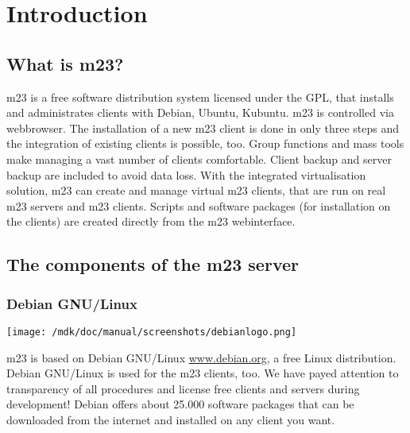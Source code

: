 \chapter{Introduction}
\section{What is m23?}
m23 is a free software distribution system licensed under the GPL, that installs and administrates clients with Debian, Ubuntu, Kubuntu. m23 is controlled via webbrowser. The installation of a new m23 client is done in only three steps and the integration of existing clients is possible, too. Group functions and mass tools make managing a vast number of clients comfortable. Client backup and server backup are included to avoid data loss. With the integrated virtualisation solution, m23 can create and manage virtual m23 clients, that are run on real m23 servers and m23 clients. Scripts and software packages (for installation on the clients) are created directly from the m23 webinterface. 

\section{The components of the m23 server}
\subsection{Debian GNU/Linux}
\begin{center}
\texttt{[image: /mdk/doc/manual/screenshots/debianlogo.png]}
\end{center}
m23 is based on Debian GNU/Linux \underline{www.debian.org}, a free Linux distribution. Debian GNU/Linux is used for the m23 clients, too. We have payed attention to transparency of all procedures and license free clients and servers during development! Debian offers about 25.000 software packages that can be downloaded from the internet and installed on any client you want.




